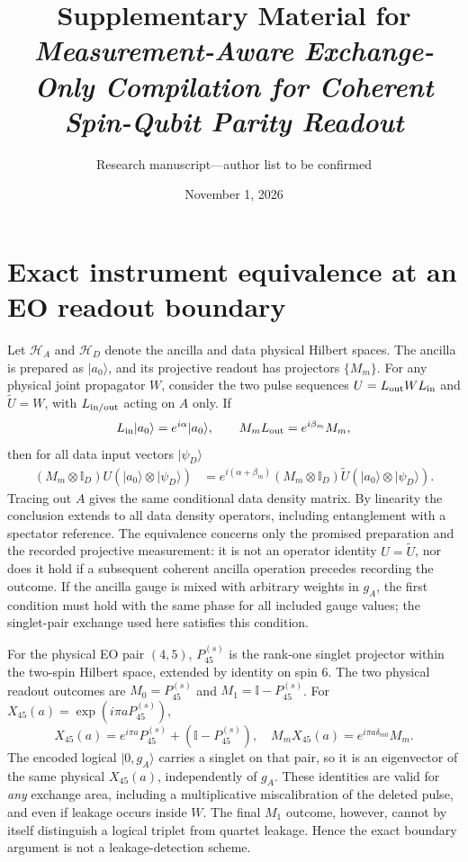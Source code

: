 \documentclass[aps,prx,onecolumn,10pt]{revtex4-2}
\newcommand{\id}{\mathbb I}
\newcommand{\Ps}{P^{(s)}}
\begin{document}
\title{Supplementary Material for \emph{Measurement-Aware Exchange-Only Compilation for Coherent Spin-Qubit Parity Readout}}
\author{Research manuscript---author list to be confirmed}
\date{November 1, 2026}
\maketitle

\section{Exact instrument equivalence at an EO readout boundary}
Let $\mathcal H_A$ and $\mathcal H_D$ denote the ancilla and data physical Hilbert spaces. The ancilla is prepared as $|a_0\rangle$, and its projective readout has projectors $\{M_m\}$. For any physical joint propagator $W$, consider the two pulse sequences $U=L_{\rm out}WL_{\rm in}$ and $\widetilde U=W$, with $L_{\rm in/out}$ acting on $A$ only. If
\begin{equation}
 L_{\rm in}|a_0\rangle=e^{i\alpha}|a_0\rangle,\qquad M_m L_{\rm out}=e^{i\beta_m}M_m,
\end{equation}
then for all data input vectors $|\psi_D\rangle$
\begin{align}
(M_m\otimes\id_D)U(|a_0\rangle\otimes|\psi_D\rangle)
 &=e^{i(\alpha+\beta_m)}(M_m\otimes\id_D)\widetilde U(|a_0\rangle\otimes|\psi_D\rangle).
\end{align}
Tracing out $A$ gives the same conditional data density matrix. By linearity the conclusion extends to all data density operators, including entanglement with a spectator reference. The equivalence concerns only the promised preparation and the recorded projective measurement: it is not an operator identity $U=\widetilde U$, nor does it hold if a subsequent coherent ancilla operation precedes recording the outcome. If the ancilla gauge is mixed with arbitrary weights in $g_A$, the first condition must hold with the same phase for all included gauge values; the singlet-pair exchange used here satisfies this condition.

For the physical EO pair $(4,5)$, $\Ps_{45}$ is the rank-one singlet projector within the two-spin Hilbert space, extended by identity on spin 6. The two physical readout outcomes are $M_0=\Ps_{45}$ and $M_1=\id-\Ps_{45}$. For $X_{45}(a)=\exp(i\pi a\Ps_{45})$,
\begin{equation}
 X_{45}(a)=e^{i\pi a}\Ps_{45}+(\id-\Ps_{45}),\quad M_mX_{45}(a)=e^{i\pi a\delta_{m0}}M_m.
\end{equation}
The encoded logical $|0,g_A\rangle$ carries a singlet on that pair, so it is an eigenvector of the same physical $X_{45}(a)$, independently of $g_A$. These identities are valid for \emph{any} exchange area, including a multiplicative miscalibration of the deleted pulse, and even if leakage occurs inside $W$. The final $M_1$ outcome, however, cannot by itself distinguish a logical triplet from quartet leakage. Hence the exact boundary argument is not a leakage-detection scheme.
\end{document}
